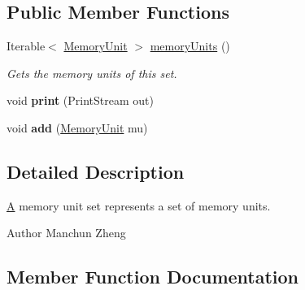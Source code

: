 \subsection*{Public Member Functions}
\begin{DoxyCompactItemize}
\item 
Iterable$<$ \hyperlink{interfaceedu_1_1udel_1_1cis_1_1vsl_1_1civl_1_1state_1_1IF_1_1MemoryUnit}{Memory\+Unit} $>$ \hyperlink{interfaceedu_1_1udel_1_1cis_1_1vsl_1_1civl_1_1state_1_1IF_1_1MemoryUnitSet_a90f0afbfa51ea4f243c1d6d3f0e9a0f7}{memory\+Units} ()
\begin{DoxyCompactList}\small\item\em Gets the memory units of this set. \end{DoxyCompactList}\item 
\hypertarget{interfaceedu_1_1udel_1_1cis_1_1vsl_1_1civl_1_1state_1_1IF_1_1MemoryUnitSet_a9dd6e84d49b19283b87b0aed29ba512e}{}void {\bfseries print} (Print\+Stream out)\label{interfaceedu_1_1udel_1_1cis_1_1vsl_1_1civl_1_1state_1_1IF_1_1MemoryUnitSet_a9dd6e84d49b19283b87b0aed29ba512e}

\item 
\hypertarget{interfaceedu_1_1udel_1_1cis_1_1vsl_1_1civl_1_1state_1_1IF_1_1MemoryUnitSet_a2c405a2c6601b90aeaac86bce49b1f65}{}void {\bfseries add} (\hyperlink{interfaceedu_1_1udel_1_1cis_1_1vsl_1_1civl_1_1state_1_1IF_1_1MemoryUnit}{Memory\+Unit} mu)\label{interfaceedu_1_1udel_1_1cis_1_1vsl_1_1civl_1_1state_1_1IF_1_1MemoryUnitSet_a2c405a2c6601b90aeaac86bce49b1f65}

\end{DoxyCompactItemize}


\subsection{Detailed Description}
\hyperlink{structA}{A} memory unit set represents a set of memory units. 

\begin{DoxyAuthor}{Author}
Manchun Zheng 
\end{DoxyAuthor}


\subsection{Member Function Documentation}
\hypertarget{interfaceedu_1_1udel_1_1cis_1_1vsl_1_1civl_1_1state_1_1IF_1_1MemoryUnitSet_a90f0afbfa51ea4f243c1d6d3f0e9a0f7}{}
